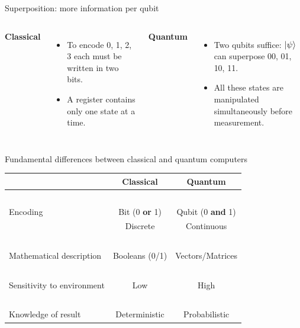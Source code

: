 \documentclass[aspectratio=169,12pt]{beamer}
\begin{document}
\begin{frame}{Superposition: more information per qubit}
  \begin{columns}[T,onlytextwidth]
    \textbf{Classical}\\
    \begin{itemize}
      \item To encode 0, 1, 2, 3 each must be written in two bits.
      \item A register contains only one state at a time.
    \end{itemize}
    \textbf{Quantum}\\
    \begin{itemize}
      \item Two qubits suffice: $\ket{\psi}$ can superpose 00, 01, 10, 11.
      \item All these states are manipulated simultaneously before measurement.
    \end{itemize}
  \end{columns}
\end{frame}


\begin{frame}{Fundamental differences between classical and quantum computers}
  \centering
  \begin{tabular}{l|c|c}
    & Classical & Quantum \\\hline
    ~& ~ & ~\\
    Encoding & Bit (0 \textbf{or} 1) & Qubit (0 \textbf{and} 1) \\
    & Discrete & Continuous \\
     ~& ~ & ~\\
    Mathematical description & Booleans (0/1) & Vectors/Matrices \\
    ~& ~ & ~\\
    Sensitivity to environment & Low & High \\
    ~& ~ & ~\\
    Knowledge of result & Deterministic & Probabilistic \\
  \end{tabular}
\end{frame}
\end{document}
